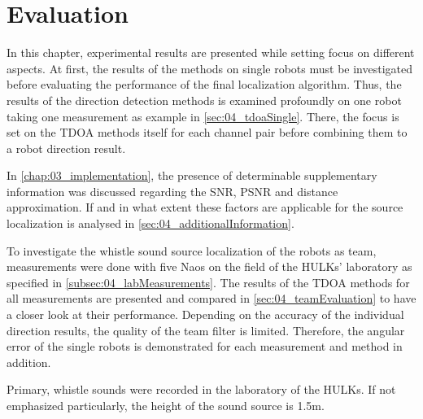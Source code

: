 \chapter{Evaluation}

In this chapter, experimental results are presented while setting
focus on different aspects.
At first, the results of the methods on single robots must be investigated
before evaluating the performance of the final localization algorithm.
Thus, the results of the direction detection methods
is examined profoundly on one robot taking one measurement as example
in \cref{sec:04_tdoaSingle}.
There, the focus is set on the \ac{TDOA} methods itself for each channel pair
before combining them to a robot direction result.

In \cref{chap:03_implementation}, the presence of determinable supplementary
information was discussed regarding the \ac{SNR}, \ac{PSNR} and distance
approximation.
If and in what extent these factors are applicable for the source localization
is analysed in \cref{sec:04_additionalInformation}.

To investigate the whistle sound source localization of the robots as team,
measurements were done with five Naos on the field of the HULKs' laboratory
as specified in \cref{subsec:04_labMeasurements}.
The results of the \ac{TDOA} methods for all measurements are presented and
compared in \cref{sec:04_teamEvaluation} to have a closer look at their performance.
Depending on the accuracy of the individual direction results, the quality
of the team filter is limited.
Therefore, the angular error of the single robots is demonstrated for each
measurement and method in addition.

Primary, whistle sounds were recorded in the laboratory of the HULKs.
If not emphasized particularly, the height of the sound source is 1.5\si{m}.





